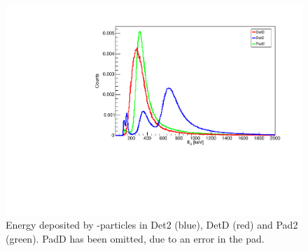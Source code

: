 \begin{figure}[h]
	\centering
	\includegraphics[width=\linewidth]{../figures/betaSpec.pdf}
	\caption{Energy deposited by \be-particles in Det2 (blue), DetD (red) and Pad2 (green). PadD has been omitted, due to an error in the pad.}
	\label{fig:beSpectrum}
\end{figure}

